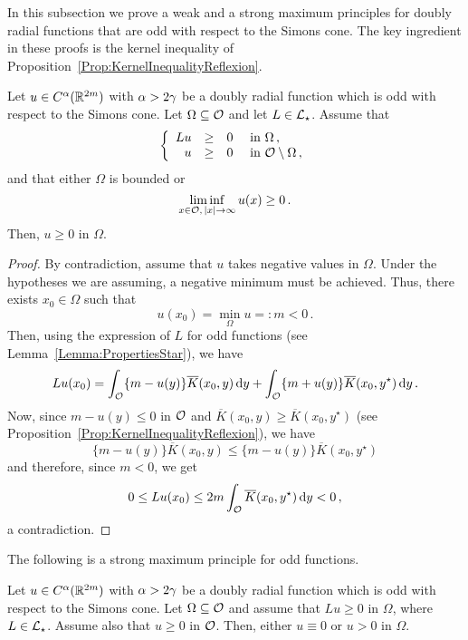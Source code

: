 In this subsection we prove a weak and a strong maximum principles for doubly radial functions that
are odd with respect to the Simons cone. The key ingredient in these proofs is the kernel
inequality of Proposition~\ref{Prop:KernelInequalityReflexion}.

\begin{proposition}
\label{Prop:WeakMaximumPrincipleForOddFunctions} Let $u\in C^{\alpha}(\mathbb{R}^{2m})$ with
$\alpha > 2\gamma$ be a doubly radial function which is odd with respect to the Simons cone. Let
$\Omega \subseteq \mathcal{O}$ and let $L \in \mathcal{L}_\star$. Assume that
$$
\left\{\begin{array}{rcll}
Lu & \geq & 0 & \text{ in } \Omega\,,\\
u & \geq & 0 & \text{ in } \mathcal{O} \setminus \Omega\,,
\end{array} \right.
$$
and that either $\Omega$ is bounded or 
$$
\liminf_{x \in \mathcal{O},\,|x|\to \infty} u(x) \geq 0\,.
$$
Then, $u \geq 0$ in $\Omega$.
\end{proposition}

\begin{proof}
By contradiction, assume that $u$ takes negative values in $\Omega$. Under the hypotheses we are
assuming, a negative minimum must be achieved. Thus, there exists $x_0\in \Omega$ such that
$$
u(x_0) = \min_{\Omega} u =: m < 0\,.
$$
Then, using the expression of $L$ for odd functions (see Lemma~\ref{Lemma:PropertiesStar}), we have
$$
Lu (x_0) = \int_{\mathcal{O}} \{m - u(y) \} \overline{K}(x_0, y) \,\mathrm{d} y +  \int_{\mathcal{O}} \{m + u(y) \} \overline{K}(x_0, y^\star) \,\mathrm{d} y\,.
$$
Now, since $m - u(y) \leq 0$ in $\mathcal{O}$ and $\overline{K}(x_0, y) \geq \overline{K}(x_0, y^\star)$ (see Proposition~\ref{Prop:KernelInequalityReflexion}), we have
$$
\{m - u(y) \} \overline{K}(x_0, y) \leq \{m - u(y) \} \overline{K}(x_0, y^\star)
$$
and therefore, since $m<0$, we get
$$
0 \leq L u(x_0) \leq 2m \int_{\mathcal{O}} \overline{K}(x_0, y^\star) \,\mathrm{d} y < 0\,,
$$
a contradiction.
\end{proof}

The following is a strong maximum principle for odd functions.

\begin{proposition}
\label{Prop:StrongMaximumPrincipleForOddFunctions} Let $u\in C^{\alpha}(\mathbb{R}^{2m})$ with
$\alpha > 2\gamma$ be a doubly radial function which is odd with respect to the Simons cone.  Let
$\Omega \subseteq \mathcal{O}$ and assume that $Lu \geq 0$ in $\Omega$, where $L \in \mathcal{L}_\star$. Assume also that $u\geq 0$ in $\mathcal{O}$.
Then, either $u\equiv 0$ or $u > 0$ in $\Omega$.
\end{proposition}

